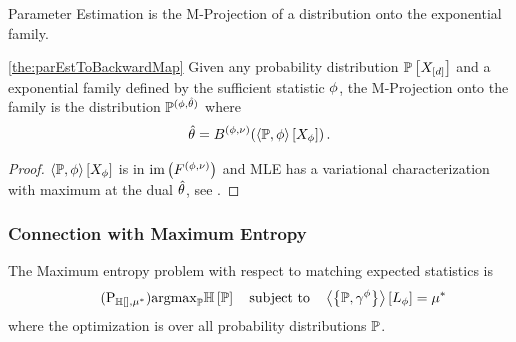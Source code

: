 
Parameter Estimation is the M-Projection of a distribution onto the exponential family.

\begin{theorem}\ref{the:parEstToBackwardMap}
	Given any probability distribution $\mathbb{P}\left[X_{[d]}\right]$ and a exponential family defined by the sufficient statistic $\phi$, the M-Projection onto the family is the distribution $\mathbb{P}^{(\phi,\hat{\theta})}$ where
	\begin{align*}
		\hat{\theta} = B^{(\phi,\nu)}(\left\langle \mathbb{P},\phi\right\rangle \left[ X_{\phi} \right]) \, .
	\end{align*}
\end{theorem}
\begin{proof}
	$\left\langle \mathbb{P},\phi\right\rangle \left[ X_{\phi} \right]$ is in $\mathrm{im}\left(F^{(\phi,\nu)}\right)$ and MLE has a variational characterization with maximum at the dual $\hat{\theta}$, see \cite{wainwright_graphical_2008}.
\end{proof}





\subsubsection{Connection with Maximum Entropy}\label{sec:maxEntDuality}




The Maximum entropy problem with respect to matching expected statistics is
\begin{align}\tag{$\mathrm{P}_{\sentropyof{}, \genmean}$}\label{prob:maxEntropy}
	\argmax_{\probtensor} \sentropyof{\probtensor} \quad \text{subject to} \quad  \sbcontractionof{\probtensor,\sencodingof{\sstat}}{\selvariableof{\sstat}} =  \genmean
\end{align}
where the optimization is over all probability distributions $\mathbb{P}$.





